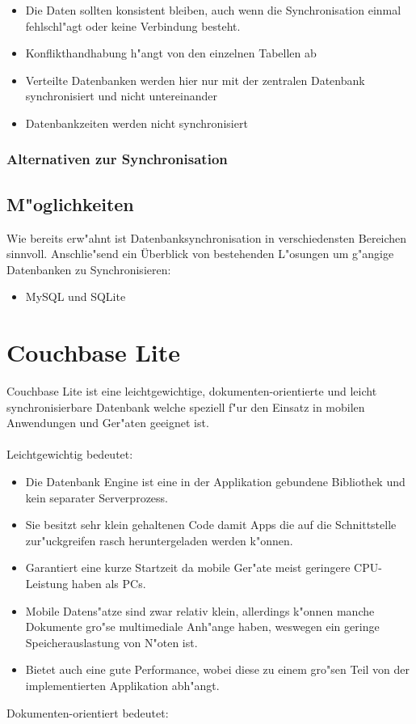 \documentclass[a4paper,12pt]{scrreprt}
\begin{document}
\begin{itemize}
\item Die Daten sollten konsistent bleiben, auch wenn die Synchronisation einmal fehlschl"agt oder keine Verbindung besteht.
\item Konflikthandhabung h"angt von den einzelnen Tabellen ab
\item Verteilte Datenbanken werden hier nur mit der zentralen Datenbank synchronisiert und nicht untereinander
\item Datenbankzeiten werden nicht synchronisiert
\end{itemize}
\subsection{Alternativen zur Synchronisation}

\section{M"oglichkeiten}
Wie bereits erw"ahnt ist Datenbanksynchronisation in verschiedensten Bereichen sinnvoll. Anschlie"send ein Überblick von bestehenden L"osungen um g"angige Datenbanken zu Synchronisieren:
\begin{itemize}
\item MySQL und SQLite
\end{itemize}
 
\chapter{Couchbase Lite}
Couchbase Lite ist eine leichtgewichtige, dokumenten-orientierte und leicht synchronisierbare Datenbank welche speziell f"ur den Einsatz in mobilen Anwendungen und Ger"aten geeignet ist.\\\\  Leichtgewichtig bedeutet:

\begin{itemize}
\item Die Datenbank Engine ist eine in der Applikation gebundene Bibliothek und kein separater Serverprozess.
\item Sie besitzt sehr klein gehaltenen Code damit Apps die auf die Schnittstelle zur"uckgreifen rasch heruntergeladen werden k"onnen.
\item Garantiert eine kurze Startzeit da mobile Ger"ate meist geringere CPU-Leistung haben als PCs.
\item Mobile Datens"atze sind zwar relativ klein, allerdings k"onnen manche Dokumente gro"se multimediale Anh"ange haben, weswegen ein geringe Speicherauslastung von N"oten ist.
\item Bietet auch eine gute Performance, wobei diese zu einem gro"sen Teil von der implementierten Applikation abh"angt.
\end{itemize}
Dokumenten-orientiert bedeutet:
\end{document}
